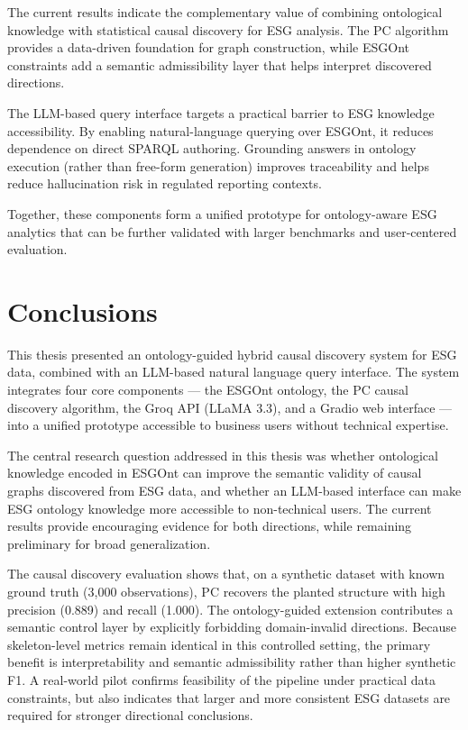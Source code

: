 \documentclass[a4paper,11pt,oneside]{article}
\begin{document}
The current results indicate the complementary value of combining ontological knowledge with statistical causal discovery for ESG analysis. The PC algorithm provides a data-driven foundation for graph construction, while ESGOnt constraints add a semantic admissibility layer that helps interpret discovered directions.

The LLM-based query interface targets a practical barrier to ESG knowledge accessibility. By enabling natural-language querying over ESGOnt, it reduces dependence on direct SPARQL authoring. Grounding answers in ontology execution (rather than free-form generation) improves traceability and helps reduce hallucination risk in regulated reporting contexts.

Together, these components form a unified prototype for ontology-aware ESG analytics that can be further validated with larger benchmarks and user-centered evaluation.

\section{Conclusions}

This thesis presented an ontology-guided hybrid causal discovery system for ESG data, combined with an LLM-based natural language query interface. The system integrates four core components — the ESGOnt ontology, the PC causal discovery algorithm, the Groq API (LLaMA 3.3), and a Gradio web interface — into a unified prototype accessible to business users without technical expertise.

The central research question addressed in this thesis was whether ontological knowledge encoded in ESGOnt can improve the semantic validity of causal graphs discovered from ESG data, and whether an LLM-based interface can make ESG ontology knowledge more accessible to non-technical users. The current results provide encouraging evidence for both directions, while remaining preliminary for broad generalization.

The causal discovery evaluation shows that, on a synthetic dataset with known ground truth (3,000 observations), PC recovers the planted structure with high precision (0.889) and recall (1.000). The ontology-guided extension contributes a semantic control layer by explicitly forbidding domain-invalid directions. Because skeleton-level metrics remain identical in this controlled setting, the primary benefit is interpretability and semantic admissibility rather than higher synthetic F1. A real-world pilot confirms feasibility of the pipeline under practical data constraints, but also indicates that larger and more consistent ESG datasets are required for stronger directional conclusions.
\end{document}
